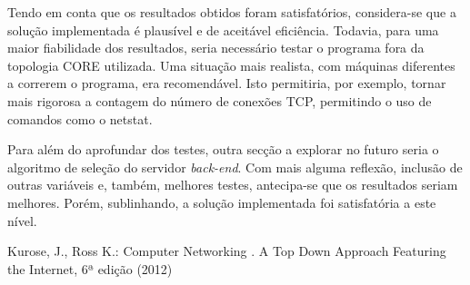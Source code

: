 \documentclass{llncs}
\begin{document}
Tendo em conta que os resultados obtidos foram satisfatórios, considera-se que a solução implementada é plausível e de aceitável eficiência. Todavia, para uma maior fiabilidade dos resultados, seria necessário testar o programa fora da topologia CORE utilizada. Uma situação mais realista, com máquinas diferentes a correrem o programa, era recomendável. Isto permitiria, por exemplo, tornar mais rigorosa a contagem do número de conexões TCP, permitindo o uso de comandos como o netstat.\par
Para além do aprofundar dos testes, outra secção a explorar no futuro seria o algoritmo de seleção do servidor \textit{back-end}. Com mais alguma reflexão, inclusão de outras variáveis e, também, melhores testes, antecipa-se que os resultados seriam melhores. Porém, sublinhando, a solução implementada foi satisfatória a este nível.

\newpage
%

\begin{thebibliography}{1}

Kurose, J., Ross K.: Computer Networking . A Top Down Approach Featuring the Internet, 6ª edição (2012)





\end{thebibliography}
\end{document}
